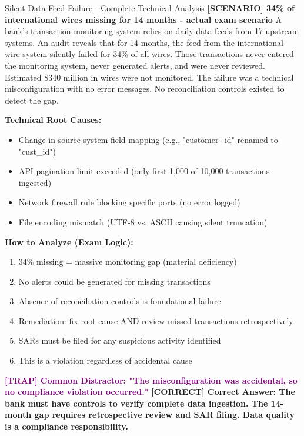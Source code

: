 \documentclass[11pt,a4paper]{beamer}
\newcommand{\trap}[1]{\textcolor{purple}{\textbf{[TRAP] #1}}}
\newcommand{\correct}[1]{\textcolor{green!50!black}{\textbf{[CORRECT] #1}}}
\newcommand{\scenario}[1]{\textcolor{blue!70!black}{\textbf{[SCENARIO] #1}}}
\begin{document}
\begin{frame}{Silent Data Feed Failure - Complete Technical Analysis}
	\scenario{34\% of international wires missing for 14 months - actual exam scenario}
	A bank's transaction monitoring system relies on daily data feeds from 17 upstream systems. An audit reveals that for 14 months, the feed from the international wire system silently failed for 34\% of all wires. Those transactions never entered the monitoring system, never generated alerts, and were never reviewed. Estimated \$340 million in wires were not monitored. The failure was a technical misconfiguration with no error messages. No reconciliation controls existed to detect the gap.
	
	\vspace{0.1cm}
	\textbf{Technical Root Causes:}
	\begin{itemize}
		\item Change in source system field mapping (e.g., "customer\_id" renamed to "cust\_id")
		\item API pagination limit exceeded (only first 1,000 of 10,000 transactions ingested)
		\item Network firewall rule blocking specific ports (no error logged)
		\item File encoding mismatch (UTF-8 vs. ASCII causing silent truncation)
	\end{itemize}
	
	\vspace{0.1cm}
	\textbf{How to Analyze (Exam Logic):}
	\begin{enumerate}
		\item 34\% missing = massive monitoring gap (material deficiency)
		\item No alerts could be generated for missing transactions
		\item Absence of reconciliation controls is foundational failure
		\item Remediation: fix root cause AND review missed transactions retrospectively
		\item SARs must be filed for any suspicious activity identified
		\item This is a violation regardless of accidental cause
	\end{enumerate}
	
	\trap{Common Distractor: "The misconfiguration was accidental, so no compliance violation occurred."}
	\correct{Correct Answer: The bank must have controls to verify complete data ingestion. The 14-month gap requires retrospective review and SAR filing. Data quality is a compliance responsibility.}
\end{frame}
\end{document}
